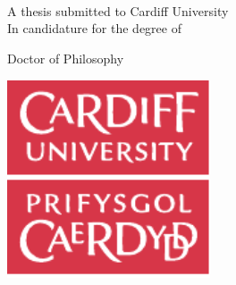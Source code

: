 \begin{titlepage}
    \begin{addmargin}[-1cm]{-3cm}
    \begin{center}
        \large

        \hfill

        \vfill

        \begingroup
            \color{CTtitle}
            \spacedallcaps{\myTitle} \\
            \spacedallcaps{\mySubtitle} \\
        \endgroup
		\bigskip

        \spacedlowsmallcaps{\myName} \\
        \bigskip

        A thesis submitted to Cardiff University \\
		In candidature for the degree of \\
		\medskip

		Doctor of Philosophy

        \vfill

        \includegraphics[width=6cm]{gfx/cardiff_logo-eps-converted-to.pdf} \\
        \vfill

        \myDepartment \\
        \myFaculty \\
        \myUni


        \vfill

    \end{center}
  \end{addmargin}
\end{titlepage}
